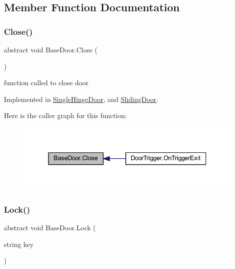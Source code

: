 \subsection{Member Function Documentation}
\mbox{\label{class_base_door_a94151e5cbf90bd3d2b55f339b87916c7}} 
\subsubsection{\texorpdfstring{Close()}{Close()}}
{\footnotesize\ttfamily abstract void Base\+Door.\+Close (\begin{DoxyParamCaption}{ }\end{DoxyParamCaption})\hspace{0.3cm}{\ttfamily [pure virtual]}}



function called to close door 



Implemented in \mbox{\hyperlink{class_single_hinge_door_a19848e36fb259f92594916d1af76d3b4}{Single\+Hinge\+Door}}, and \mbox{\hyperlink{class_sliding_door_a22d2e8580503b045da48510214599746}{Sliding\+Door}}.

Here is the caller graph for this function\+:\nopagebreak
\begin{figure}[H]
\begin{center}
\leavevmode
\includegraphics[width=331pt]{class_base_door_a94151e5cbf90bd3d2b55f339b87916c7_icgraph}
\end{center}
\end{figure}
\mbox{\label{class_base_door_a2b616c52626299f25ac25f7deab44dc4}} 
\subsubsection{\texorpdfstring{Lock()}{Lock()}}
{\footnotesize\ttfamily abstract void Base\+Door.\+Lock (\begin{DoxyParamCaption}\item[{string}]{key }\end{DoxyParamCaption})\hspace{0.3cm}{\ttfamily [pure virtual]}}



